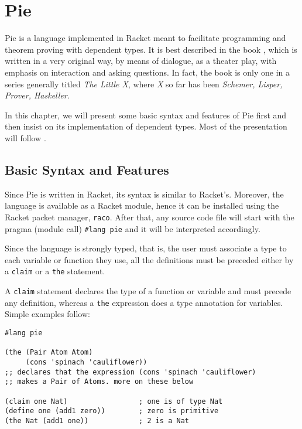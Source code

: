 \chapter{Pie}

Pie is a language implemented in Racket meant to facilitate programming
and theorem proving with dependent types. It is best described in the
book \cite{typer}, which is written in a very original way, by means of
dialogue, as a theater play, with emphasis on interaction and asking
questions. In fact, the book is only one in a series generally titled
\emph{The Little X}, where \emph{X} so far has been
\emph{Schemer, Lisper, Prover, Haskeller}.

In this chapter, we will present some basic syntax and features of Pie
first and then insist on its implementation of dependent types. Most
of the presentation will follow \cite{typer}.

\section{Basic Syntax and Features}

Since Pie is written in Racket, its syntax is similar to Racket's.
Moreover, the language is available as a Racket module, hence it can be
installed using the Racket packet manager, \texttt{raco}. After that,
any source code file will start with the pragma (module call)
\texttt{\#\!\!lang pie} and it will be interpreted accordingly.

Since the language is strongly typed, that is, the user must associate a
type to each variable or function they use, all the definitions must be
preceded either by a \texttt{claim} or a \texttt{the} statement.

A \texttt{claim} statement declares the type of a function or variable
and must precede any definition, whereas a \texttt{the} expression
does a type annotation for variables. Simple examples follow:
{
  \small
\begin{verbatim}
#lang pie

(the (Pair Atom Atom)
     (cons 'spinach 'cauliflower))
;; declares that the expression (cons 'spinach 'cauliflower)
;; makes a Pair of Atoms. more on these below

(claim one Nat)                 ; one is of type Nat
(define one (add1 zero))        ; zero is primitive
(the Nat (add1 one))            ; 2 is a Nat
\end{verbatim}
}

